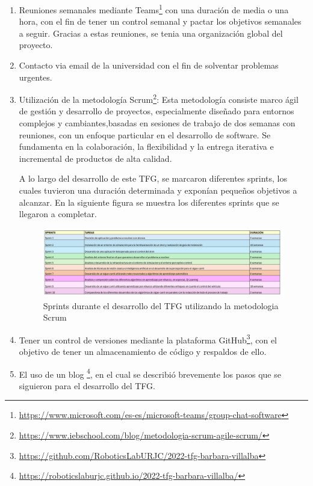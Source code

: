 \begin{enumerate}
    \item Reuniones semanales mediante Teams\footnote{\url{https://www.microsoft.com/es-es/microsoft-teams/group-chat-software}} con una duración de media o una hora, con el fin de tener un control semanal y pactar los objetivos semanales a seguir. Gracias a estas reuniones, se tenia una organización global del proyecto. 
    \item Contacto via email de la universidad con el fin de solventar problemas urgentes. 
    \item Utilización de la metodología Scrum\footnote{\url{https://www.iebschool.com/blog/metodologia-scrum-agile-scrum/}}: Esta metodología consiste marco ágil de gestión y desarrollo de proyectos, especialmente diseñado para entornos complejos y cambiantes,basadas en sesiones de trabajo de dos semanas con reuniones,
    con un enfoque particular en el desarrollo de software. Se fundamenta en la colaboración, la flexibilidad y la entrega iterativa e incremental de productos de alta calidad.\newline

    A lo largo del desarrollo de este TFG, se marcaron diferentes sprints, los cuales tuvieron una duración determinada y exponían pequeños objetivos a alcanzar. En la siguiente figura
    se muestra los diferentes sprints que se llegaron a completar. 

    \begin{figure} [H]
        \begin{center}
          \includegraphics[scale=0.25]{figs/objetivos/Sprints.png}
        \end{center}
        \caption{Sprints durante el desarrollo del TFG utilizando la metodologia Scrum}
        \label{fig:Sprints}
      \end{figure}
    

    \item Tener un control de versiones mediante la plataforma GitHub\footnote{\url{https://github.com/RoboticsLabURJC/2022-tfg-barbara-villalba}}, con el objetivo de tener un almacenamiento de código y respaldos de ello.  
    \item El uso de un blog \footnote{\url{https://roboticslaburjc.github.io/2022-tfg-barbara-villalba/}}, en el cual se describió brevemente los pasos que se siguieron para el desarrollo del TFG.
\end{enumerate}

